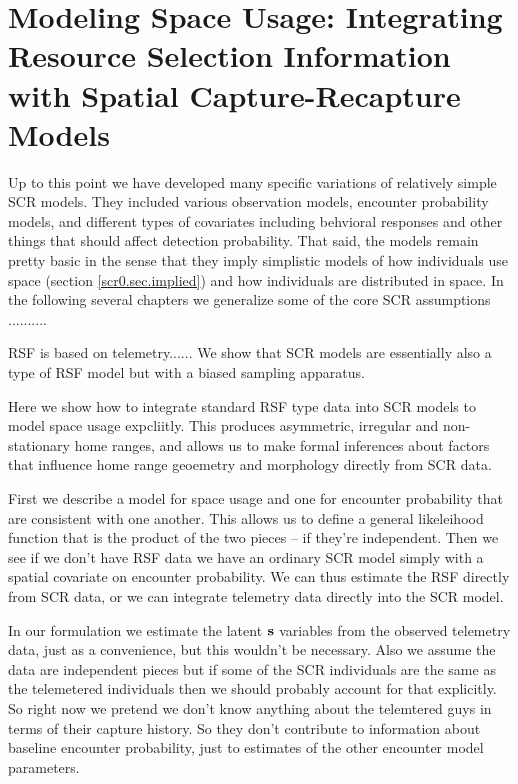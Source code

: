\chapter{
Modeling Space Usage: 
Integrating Resource Selection Information with 
Spatial Capture-Recapture
  Models}

\label{chapt.rsf}


\vspace{.3in}

Up to this point we have developed many specific variations of
relatively simple SCR models. They included various observation
models, encounter probability models, and different types of
covariates including behvioral responses and other things that should
affect detection probability.  That said, the models remain pretty
basic in the sense that they imply simplistic models of how
individuals use space (section \ref{scr0.sec.implied}) and how individuals are
distributed in space.  In the following several chapters we generalize
some of the core SCR assumptions ..........

RSF is based on telemetry...... 
We show that SCR models are essentially also a type of RSF model but
with a biased sampling apparatus. 

Here we show how to integrate standard RSF type data into SCR models
to model space usage expcliitly. This produces asymmetric, irregular
and non-stationary home ranges, and allows us to make formal
inferences about factors that influence home range geoemetry and
morphology directly from SCR data.

First we describe a model for space usage and one for encounter
probability that are consistent with one another.
This allows us to define a general likeleihood function that is the
product of the two pieces -- if they're independent. 
Then we see if we don't have RSF data we have an ordinary SCR model
simply with a spatial covariate on encounter probability. We can thus
estimate the RSF directly from SCR data, or we can integrate telemetry
data directly into the SCR model. 

In our formulation we estimate the latent ${\bf s}$ variables from the observed telemetry
data, just as a convenience, but this wouldn't be necessary.
Also we assume the data are independent pieces but if some of the SCR
individuals are the same as the telemetered individuals then we should
probably account for that explicitly. So right now we pretend we don't
know anything about the telemtered guys in terms of their capture
history. So they don't contribute to information about baseline
encounter probability, just to estimates of the other encounter model
parameters. 

